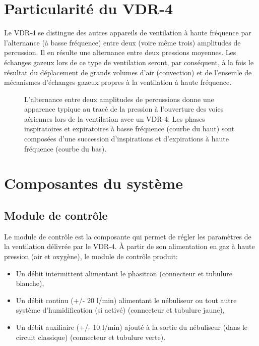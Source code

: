 \section{Particularité du VDR-4}
\label{sec:particularite}
Le VDR-4 se distingue des autres appareils de ventilation à haute
fréquence par l'alternance (à basse fréquence) entre deux (voire même
trois) amplitudes de percussion. Il en résulte une alternance entre
deux pressions moyennes. Les échanges gazeux lors de ce type de
ventilation seront, par conséquent, à la fois le résultat du
déplacement de grands volumes d'air (convection) et de l'ensemle de
mécanismes d'échanges gazeux propres à la ventilation à haute
fréquence.

\begin{figure}[h]
	
	\caption[Tracé pression - temps typique.]{L'alternance entre deux
	amplitudes de percussions donne une apparence typique au tracé de la
	pression à l'ouverture des voies aériennes lors de la ventilation
	avec un VDR-4. Les phases inspiratoires et expiratoires à basse
	fréquence (courbe du haut) sont composées d'une succession
	d'inspirations et d'expirations à haute fréquence (courbe du bas).}
\end{figure}

\section{Composantes du système}

\subsection{Module de contrôle}

Le module de contrôle est la composante qui permet de régler les
paramètres de la ventilation délivrée par le VDR-4.  À partir de son
alimentation en gaz à haute pression (air et oxygène), le module de
contrôle produit:

\begin{itemize}
	\item Un débit intermittent alimentant le phasitron (connecteur et
		tubulure blanche),
	\item Un débit continu (+/- 20 l/min) alimentant
		le nébuliseur ou tout autre système d'humidification (si activé)
		(connecteur et tubulure jaune),
	\item Un débit auxiliaire (+/- 10 l/min) ajouté à la sortie du
		nébuliseur (dans le circuit classique) (connecteur et tubulure
		verte).
\end{itemize}

